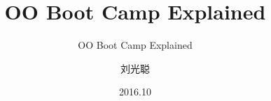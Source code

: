 \title[OO Boot Camp Explained]
{OO Boot Camp Explained}

\subtitle{OO Boot Camp Explained}

\author[刘光聪]
{ 刘光聪
}


\date[2016.10]{2016.10}
